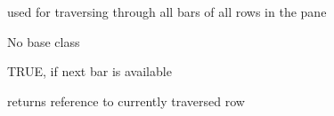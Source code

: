 %
%


\section{}\label{wxbariterator}


used for traversing through all bars of all rows in the pane


No base class




\label{wxbariteratorwxbariterator}



\label{wxbariteratorbarinfo}



\label{wxbariteratornext}


TRUE, if next bar is available


\label{wxbariteratorreset}



\label{wxbariteratorrowinfo}


returns reference to currently traversed row

